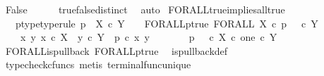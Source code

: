 \begin{isabellebody}
\ False\isanewline
\ \ \ \ \isamarkupfalse%
\ true{\isacharunderscore}{\kern0pt}false{\isacharunderscore}{\kern0pt}distinct\ \isamarkupfalse%
\ auto\isanewline
{}\isamarkupfalse%
%
\endisatagproof
{\isafoldproof}%
%
\isadelimproof
\isanewline
%
\endisadelimproof
\isanewline
{}\isamarkupfalse%
\ FORALL{\isacharunderscore}{\kern0pt}true{\isacharunderscore}{\kern0pt}implies{\isacharunderscore}{\kern0pt}all{\isacharunderscore}{\kern0pt}true{}{\isacharcolon}{\kern0pt}\isanewline
\ \ \ p{\isacharunderscore}{\kern0pt}type{\isacharbrackleft}{\kern0pt}type{\isacharunderscore}{\kern0pt}rule{\isacharbrackright}{\kern0pt}{\isacharcolon}{\kern0pt}\ {\isachardoublequoteopen}p\ {\isacharcolon}{\kern0pt}\ X\ {\isasymtimes}\isactrlsub c\ Y\ {\isasymrightarrow}\ {\isasymOmega}{\isachardoublequoteclose}\ \ FORALL{\isacharunderscore}{\kern0pt}p{\isacharunderscore}{\kern0pt}true{\isacharcolon}{\kern0pt}\ {\isachardoublequoteopen}FORALL\ X\ {\isasymcirc}\isactrlsub c\ p\isactrlsup {\isasymsharp}\ {\isacharequal}{\kern0pt}\ {\isasymt}\ {\isasymcirc}\isactrlsub c\ {\isasymbeta}\isactrlbsub Y\isactrlesub {\isachardoublequoteclose}\isanewline
\ \ \ {\isachardoublequoteopen}{\isasymAnd}\ x\ y{\isachardot}{\kern0pt}\ x\ {\isasymin}\isactrlsub c\ X\ {\isasymLongrightarrow}\ y\ {\isasymin}\isactrlsub c\ Y\ {\isasymLongrightarrow}\ p\ {\isasymcirc}\isactrlsub c\ {\isasymlangle}x{\isacharcomma}{\kern0pt}\ y{\isasymrangle}\ {\isacharequal}{\kern0pt}\ {\isasymt}{\isachardoublequoteclose}\isanewline
%
\isadelimproof
%
\endisadelimproof
%
\isatagproof
{}\isamarkupfalse%
\ {\isacharminus}{\kern0pt}\isanewline
\ \ \isamarkupfalse%
\ {\isachardoublequoteopen}p\isactrlsup {\isasymsharp}\ {\isacharequal}{\kern0pt}\ {\isacharparenleft}{\kern0pt}{\isasymt}\ {\isasymcirc}\isactrlsub c\ {\isasymbeta}\isactrlbsub X\ {\isasymtimes}\isactrlsub c\ one\isactrlesub {\isacharparenright}{\kern0pt}\isactrlsup {\isasymsharp}\ {\isasymcirc}\isactrlsub c\ {\isasymbeta}\isactrlbsub Y\isactrlesub {\isachardoublequoteclose}\isanewline
\ \ \ \ \isamarkupfalse%
\ FORALL{\isacharunderscore}{\kern0pt}is{\isacharunderscore}{\kern0pt}pullback\ FORALL{\isacharunderscore}{\kern0pt}p{\isacharunderscore}{\kern0pt}true\ \isamarkupfalse%
\ is{\isacharunderscore}{\kern0pt}pullback{\isacharunderscore}{\kern0pt}def\ \isanewline
\ \ \ \ \isamarkupfalse%
\ {\isacharparenleft}{\kern0pt}typecheck{\isacharunderscore}{\kern0pt}cfuncs{\isacharcomma}{\kern0pt}\ metis\ terminal{\isacharunderscore}{\kern0pt}func{\isacharunderscore}{\kern0pt}unique{\isacharparenright}{\kern0pt}\isanewline

\end{isabellebody}
